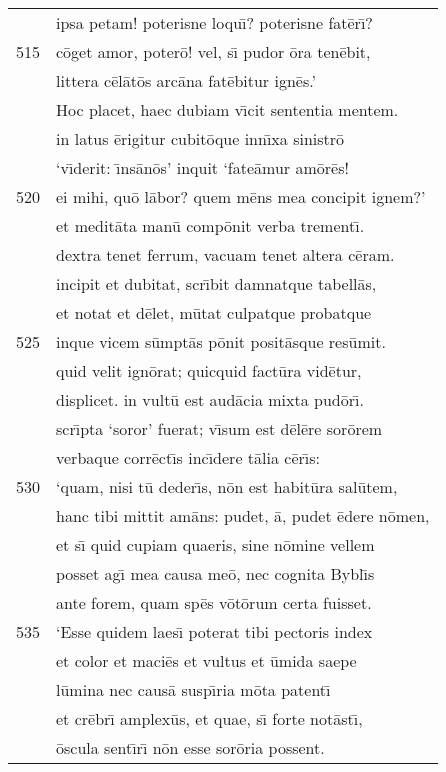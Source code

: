 \documentclass[paper=6in:9in,pagesize=pdftex,
               headinclude=on,footinclude=on,12pt]{scrbook}
\begin{document}
\begin{longtable}[p]{ r l }
 & ipsa petam! poterisne loqu\={\i}? poterisne fat\=er\={\i}?\\ 
515 & c\=oget amor, poter\=o! vel, s\={\i} pudor \=ora ten\=ebit,\\ 
 & littera c\=el\=at\=os arc\=ana fat\=ebitur ign\=es.'\\ 
 & \indent Hoc placet, haec dubiam v\={\i}cit sententia mentem.\\ 
 & in latus \=erigitur cubit\=oque inn\={\i}xa sinistr\=o\\ 
 & `v\={\i}derit: \={\i}ns\=an\=os' inquit `fate\=amur am\=or\=es!\\ 
520 & ei mihi, qu\=o l\=abor? quem m\=ens mea concipit ignem?'\\ 
 & et medit\=ata man\=u comp\=onit verba trement\={\i}.\\ 
 & dextra tenet ferrum, vacuam tenet altera c\=eram.\\ 
 & incipit et dubitat, scr\={\i}bit damnatque tabell\=as,\\ 
 & et notat et d\=elet, m\=utat culpatque probatque\\ 
525 & inque vicem s\=umpt\=as p\=onit posit\=asque res\=umit.\\ 
 & quid velit ign\=orat; quicquid fact\=ura vid\=etur,\\ 
 & displicet. in vult\=u est aud\=acia mixta pud\=or\={\i}.\\ 
 & scr\={\i}pta `soror' fuerat; v\={\i}sum est d\=el\=ere sor\=orem\\ 
 & verbaque corr\=ect\={\i}s inc\={\i}dere t\=alia c\=er\={\i}s:\\ 
530 & `quam, nisi t\=u deder\={\i}s, n\=on est habit\=ura sal\=utem,\\ 
 & hanc tibi mittit am\=ans: pudet, \=a, pudet \=edere n\=omen,\\ 
 & et s\={\i} quid cupiam quaeris, sine n\=omine vellem\\ 
 & posset ag\={\i} mea causa me\=o, nec cognita Bybl\={\i}s\\ 
 & ante forem, quam sp\=es v\=ot\=orum certa fuisset.\\ 
535 & \indent `Esse quidem laes\={\i} poterat tibi pectoris index\\ 
 & et color et maci\=es et vultus et \=umida saepe\\ 
 & l\=umina nec caus\=a susp\={\i}ria m\=ota patent\={\i}\\ 
 & et cr\=ebr\={\i} amplex\=us, et quae, s\={\i} forte not\=ast\={\i},\\ 
 & \=oscula sent\={\i}r\={\i} n\=on esse sor\=oria possent.\\ 

\end{longtable}
\end{document}
